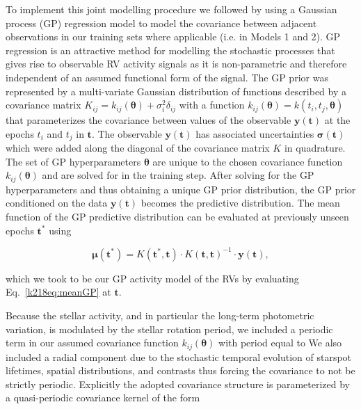 To implement this joint modelling procedure
we followed \cite{cloutier17a} by using a Gaussian process (GP) regression model to model the covariance between
adjacent observations in our training sets where applicable (i.e. in Models 1 and 2).
GP regression is an attractive method for modelling the
stochastic processes that gives rise to observable RV activity signals as it is non-parametric and therefore
independent of an assumed functional form of the signal. The GP prior was represented by a multi-variate
Gaussian distribution of functions described by a covariance matrix
$K_{ij}=k_{ij}(\boldsymbol{\theta}) + \sigma^2_i\delta_{ij}$
with a function $k_{ij}(\boldsymbol{\theta})=k(t_i,t_j,\boldsymbol{\theta})$ that parameterizes the
covariance between values of the observable $\mathbf{y}(\mathbf{t})$ at the epochs $t_i$ and $t_j$ in
$\mathbf{t}$. The observable $\mathbf{y}(\mathbf{t})$ has associated uncertainties
$\boldsymbol{\sigma}(\mathbf{t})$
which were added along the diagonal of the covariance matrix $K$ in quadrature. 
The set of GP hyperparameters $\boldsymbol{\theta}$ are unique to the chosen covariance function
$k_{ij}(\boldsymbol{\theta})$ and are solved for in the training step. After solving for the
GP hyperparameters and thus obtaining a unique GP prior distribution, the GP prior conditioned on the data
$\mathbf{y}(\mathbf{t})$ becomes the predictive distribution. The mean function of the GP predictive distribution
can be evaluated at previously unseen epochs $\mathbf{t^*}$ using 

\begin{equation}
  \boldsymbol{\mu}(\mathbf{t^*}) = K(\mathbf{t^*},\mathbf{t}) \cdot K(\mathbf{t},\mathbf{t})^{-1} \cdot
  \mathbf{y}(\mathbf{t}), \label{k218eq:meanGP}
\end{equation}

\noindent which we took to be our GP activity model of the RVs 
by evaluating Eq.~\ref{k218eq:meanGP} at $\mathbf{t}$.

Because the stellar activity, and in particular the long-term photometric variation,
is modulated by the stellar rotation period, we included a
periodic term in our assumed covariance function $k_{ij}(\boldsymbol{\theta})$
with period equal to  We also included a radial component 
due to the stochastic temporal evolution of starspot lifetimes, spatial distributions,
and contrasts thus forcing the covariance to not be strictly periodic.
Explicitly the adopted covariance structure is
parameterized by a quasi-periodic covariance kernel of the form

